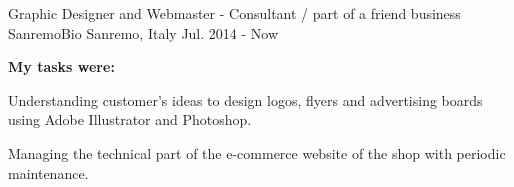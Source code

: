 {\begin{cventries}
  \cventry
  {Graphic Designer and Webmaster - Consultant / part of a friend business} %
  {SanremoBio} %
  {Sanremo, Italy} %
  {Jul. 2014 - Now} %
  {
    \begin{cvparagraph}
      \textbf{My tasks were:}
    \end{cvparagraph}
    \begin{cvitems} %
      \item {Understanding customer's ideas to design logos, flyers and advertising boards using Adobe Illustrator and Photoshop.}
      \item {Managing the technical part of the e-commerce website of the shop with periodic maintenance.}
    \end{cvitems}
  }
\end{cventries}
}